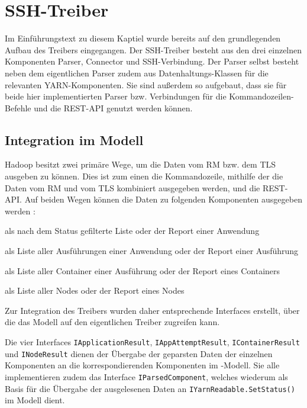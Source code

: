 \section{SSH-Treiber}\label{sec:sshDriver}

Im Einführungstext zu diesem Kaptiel wurde bereits auf den grundlegenden Aufbau des Treibers eingegangen. Der SSH-Treiber besteht aus den drei einzelnen Komponenten Parser, Connector und SSH-Verbindung. Der Parser selbst besteht neben dem eigentlichen Parser zudem aus Datenhaltungs-Klassen für die relevanten YARN-Komponenten. Sie sind außerdem so aufgebaut, dass sie für beide hier implementierten Parser bzw. Verbindungen für die Kommandozeilen-Befehle und die REST-API genutzt werden können.

\subsection{Integration im Modell}\label{sec:modelIntegration}

Hadoop besitzt zwei primäre Wege, um die Daten vom \ac{RM} bzw. dem \ac{TLS} ausgeben zu können. Dies ist zum einen die Kommandozeile, mithilfe der die Daten vom \ac{RM} und vom \ac{TLS} kombiniert ausgegeben werden, und die REST-API. Auf beiden Wegen können \uA die Daten zu folgenden Komponenten ausgegeben werden \cite{HadoopYarnTlServer271,HadoopYarnCmds271,HadoopRmApi271,HadoopNmApi271}:

\begin{description}[noitemsep]
    \item[Anwendungen] als nach dem Status gefilterte Liste oder der Report einer Anwendung
    \item[Ausführungen] als Liste aller Ausführungen einer Anwendung oder der Report einer Ausführung
    \item[Container] als Liste aller Container einer Ausführung oder der Report eines Containers
    \item[Nodes] als Liste aller Nodes oder der Report eines Nodes
\end{description}

Zur Integration des Treibers wurden daher entsprechende Interfaces erstellt, über die das Modell auf den eigentlichen Treiber zugreifen kann.

Die vier Interfaces \texttt{IApplicationResult}, \texttt{IAppAttemptResult}, \texttt{IContainerResult} und \texttt{INodeResult} dienen der Übergabe der geparsten Daten der einzelnen Komponenten an die korrespondierenden Komponenten im \sS-Modell. Sie alle implementieren zudem das Interface \texttt{IParsedComponent}, welches wiederum als Basis für die Übergabe der ausgelesenen Daten an \texttt{IYarnReadable.SetStatus()} im Modell dient.

